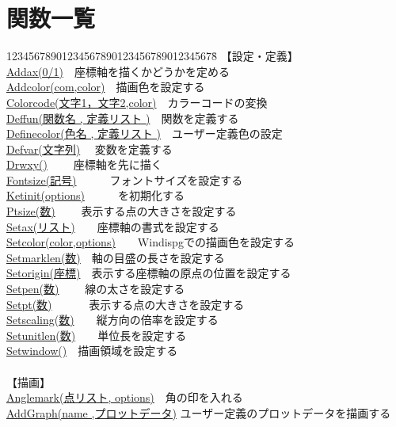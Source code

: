 \documentclass[papersize,a4paper,12pt,uplatex]{jsarticle}
\begin{document}
\section{関数一覧}
\begin{tabbing}
12345678901234567890123456789012345678\=\kill
【設定・定義】\\
\hyperlink{addax}{Addax(0/1)}　\>座標軸を描くかどうかを定める\\
\hyperlink{addcolor}{Addcolor(com,color)}　\>描画色を設定する\\
\hyperlink{colorcode}{Colorcode(文字1，文字2,color)}　\>カラーコードの変換\\
\hyperlink{deffun}{Deffun(関数名 , 定義リスト )}　\>関数を定義する\\
\hyperlink{definecolor}{Definecolor(色名 , 定義リスト )}　\>ユーザー定義色の設定\\
\hyperlink{defvar}{Defvar(文字列)} 　\>変数を定義する\\
\hyperlink{drwxy}{Drwxy()} 　　\>座標軸を先に描く\\
\hyperlink{fontsize}{Fontsize(記号)}　　　\>フォントサイズを設定する\\
\hyperlink{ketint}{Ketinit(options)}　　　\>\ketcindy を初期化する\\
\hyperlink{ptsie}{Ptsize(数)}   　　\>表示する点の大きさを設定する\\
\hyperlink{setax}{Setax(リスト)}　　\>座標軸の書式を設定する\\
\hyperlink{setcolor}{Setcolor(color,options)}　　\>Windispgでの描画色を設定する\\
\hyperlink{setmarklen}{Setmarklen(数)}　\>軸の目盛の長さを設定する\\
\hyperlink{setorigin}{Setorigin(座標)}　\>表示する座標軸の原点の位置を設定する\\
\hyperlink{setpen}{Setpen(数)}  　　\>線の太さを設定する\\
\hyperlink{setpt}{Setpt(数)}    　　　\>表示する点の大きさを設定する\\
\hyperlink{setscaling}{Setscaling(数)}　　\>縦方向の倍率を設定する\\
\hyperlink{setunitlen}{Setunitlen(数)}　　\>単位長を設定する\\
\hyperlink{setwindow}{Setwindow()}　\>描画領域を設定する\\
\\
【描画】\\
\hyperlink{anglemark}{Anglemark(点リスト, options)}　\>角の印を入れる\\
\hyperlink{addgraph}{AddGraph(name ,プロットデータ)} \>ユーザー定義のプロットデータを描画する\\

\end{tabbing}
\end{document}

